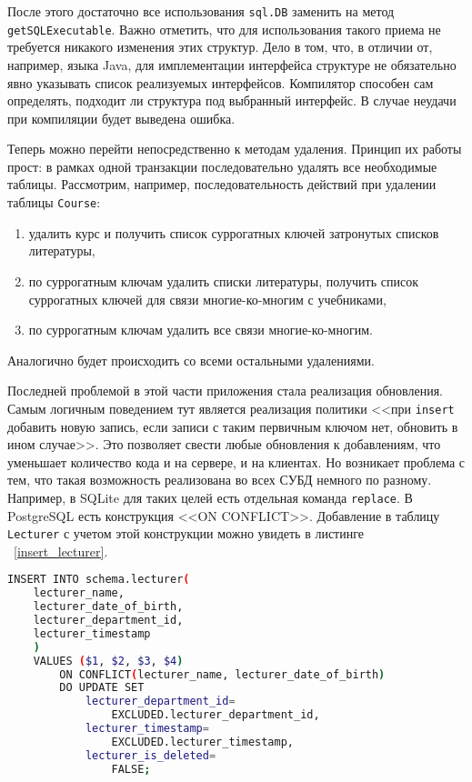 После этого достаточно все использования \texttt{sql.DB} заменить на метод \texttt{getSQLExecutable}.
Важно отметить, что для использования такого приема не требуется никакого изменения этих структур.
Дело в том, что, в отличии от, например, языка Java, для имплементации интерфейса структуре не
обязательно явно указывать список реализуемых интерфейсов. Компилятор способен сам определять, подходит
ли структура под выбранный интерфейс. В случае неудачи при компиляции будет выведена ошибка.

Теперь можно перейти непосредственно к методам удаления. Принцип их работы прост: в рамках одной
транзакции последовательно удалять все необходимые таблицы. Рассмотрим, например, последовательность действий
при удалении таблицы \texttt{Course}:

\begin{enumerate}
	\item удалить курс и получить список суррогатных ключей затронутых списков литературы,
	\item по суррогатным ключам удалить списки литературы, получить список суррогатных ключей
	      для связи многие-ко-многим с учебниками,
	\item по суррогатным ключам удалить все связи многие-ко-многим.
\end{enumerate}

Аналогично будет происходить со всеми остальными удалениями.

Последней проблемой в этой части приложения стала реализация обновления. Самым логичным поведением тут
является реализация политики <<при \texttt{insert} добавить новую запись, если записи с таким первичным ключом нет, 
обновить в ином случае>>. Это позволяет свести любые обновления к добавлениям, что уменьшает количество
кода и на сервере, и на клиентах. Но возникает проблема с тем, что такая возможность реализована во всех
СУБД немного по разному. Например, в SQLite для таких целей есть отдельная команда \texttt{replace}.
В PostgreSQL есть конструкция <<ON CONFLICT>>. Добавление в таблицу \texttt{Lecturer} с учетом этой конструкции можно
увидеть в листинге ~\ref{insert_lecturer}.

\begin{lstlisting}[language=bash, caption = {SQL запрос добавления записи в таблицу Lecturer}, captionpos=b, label={insert_lecturer}]
INSERT INTO schema.lecturer(
    lecturer_name, 
    lecturer_date_of_birth,
    lecturer_department_id, 
    lecturer_timestamp
    ) 
    VALUES ($1, $2, $3, $4)
        ON CONFLICT(lecturer_name, lecturer_date_of_birth) 
        DO UPDATE SET
            lecturer_department_id=
                EXCLUDED.lecturer_department_id,
            lecturer_timestamp=
                EXCLUDED.lecturer_timestamp,
            lecturer_is_deleted=
                FALSE;
\end{lstlisting}

